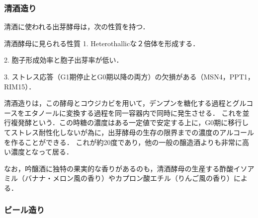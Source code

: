 \documentclass[uplatex, dvipdfmx]{jsarticle}
\begin{document}
\subsubsection{清酒造り}

清酒に使われる出芽酵母は，次の性質を持つ．
\begin{itembox}[l]{清酒酵母に見られる性質}
    1. Heterothallicな２倍体を形成する．

    2. 胞子形成効率と胞子出芽率が低い．

    3. ストレス応答（G1期停止とG0期以降の両方）の欠損がある（MSN4，PPT1，RIM15）．
\end{itembox}

清酒造りは，この酵母とコウジカビを用いて，デンプンを糖化する過程とグルコースをエタノールに変換する過程を同一容器内で同時に発生させる．
これを並行複発酵という．この時糖の濃度はある一定値で安定する上に，G0期に移行してストレス耐性化しないが為に，出芽酵母の生存の限界までの濃度のアルコールを作ることができる．
これが約20度であり，他の一般の醸造酒よりも非常に高い濃度となって居る．

なお，吟醸酒に独特の果実的な香りがあるのも，清酒酵母の生産する酢酸イソアミル（バナナ・メロン風の香り）やカプロン酸エチル（りんご風の香り）による．

\subsubsection{ビール造り}
\end{document}
